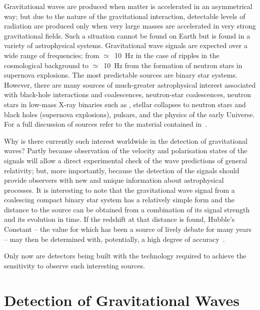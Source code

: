 \documentclass{article}
\begin{document}
Gravitational waves are produced when matter is accelerated in an asymmetrical
way; but due to the nature of the gravitational interaction, detectable levels
of radiation are produced only when very large masses are accelerated in very
strong gravitational fields. Such a situation cannot be found on Earth but is
found in a variety of astrophysical systems. Gravitational wave signals are
expected over a wide range of frequencies; from $\simeq$~10~Hz in the case
of ripples in the cosmological background to $\simeq$~10~Hz from the formation
of neutron stars in supernova explosions. The most predictable sources are
binary star systems. However, there are many sources of much-greater
astrophysical interest associated with black-hole interactions and coalescences,
neutron-star coalescences, neutron stars in low-mass X-ray binaries such as
, stellar collapses to neutron stars and black holes (supernova
explosions), pulsars, and the physics of the early Universe. For a full
discussion of sources refer to the material contained in~\cite{Sathyaprakash:2009,LISAsymposium, sources, Amaldiproc}.

Why is there currently such interest worldwide in the detection of gravitational
waves? Partly because observation of the velocity and polarisation states of the
signals will allow a direct experimental check of the wave predictions of
general relativity; but, more importantly, because the detection of the signals
should provide observers with new and unique information about astrophysical
processes. It is interesting to note that the gravitational wave signal from a
coalescing compact binary star system has a relatively simple form and the
distance to the source can be obtained from a combination of its signal strength
and its evolution in time. If the redshift at that distance is found, Hubble's
Constant -- the value for which has been a source of lively debate for many
years -- may then be determined with, potentially, a high degree of
accuracy~\cite{Schutz,Holtz:2005}.

Only now are detectors being built with the technology required to achieve the
sensitivity to observe such interesting sources.


\newpage

\section{Detection of Gravitational Waves}
\label{section:Detection}
\end{document}
